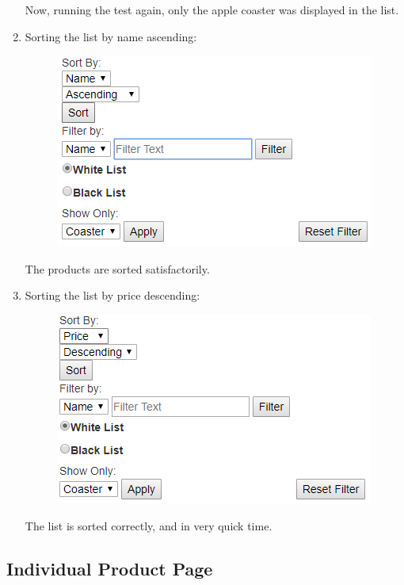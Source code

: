﻿\documentclass{article}
\begin{document}
\begin{enumerate}
        Now, running the test again, only the apple coaster was displayed in the list.
        \item Sorting the list by name ascending:
        \begin{figure}[H]
            \includegraphics{testing/products3.png}
            \centering
        \end{figure}
        The products are sorted satisfactorily.
        \item Sorting the list by price descending:
        \begin{figure}[H]
            \includegraphics{testing/products4.png}
            \centering
        \end{figure}
        The list is sorted correctly, and in very quick time.
    \end{enumerate}
    \newpage
    \subsection{Individual Product Page}
\end{document}
